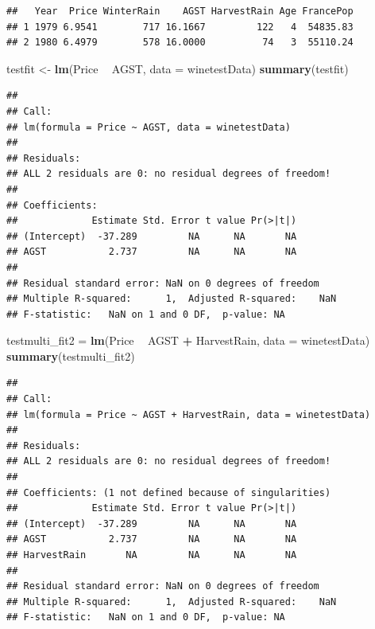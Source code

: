 \documentclass[
]{article}
\newenvironment{Shaded}{\begin{snugshade}}{\end{snugshade}}
\newcommand{\DataTypeTok}[1]{\textcolor[rgb]{0.13,0.29,0.53}{#1}}
\newcommand{\KeywordTok}[1]{\textcolor[rgb]{0.13,0.29,0.53}{\textbf{#1}}}
\newcommand{\NormalTok}[1]{#1}
\newcommand{\OperatorTok}[1]{\textcolor[rgb]{0.81,0.36,0.00}{\textbf{#1}}}
\newcommand{\StringTok}[1]{\textcolor[rgb]{0.31,0.60,0.02}{#1}}
\begin{document}
\begin{verbatim}
##   Year  Price WinterRain    AGST HarvestRain Age FrancePop
## 1 1979 6.9541        717 16.1667         122   4  54835.83
## 2 1980 6.4979        578 16.0000          74   3  55110.24
\end{verbatim}

\begin{Shaded}
\begin{Highlighting}[]
\NormalTok{testfit <-}\StringTok{ }\KeywordTok{lm}\NormalTok{(Price }\OperatorTok{~}\StringTok{ }\NormalTok{AGST, }\DataTypeTok{data =}\NormalTok{ winetestData)}
\KeywordTok{summary}\NormalTok{(testfit)}
\end{Highlighting}
\end{Shaded}

\begin{verbatim}
## 
## Call:
## lm(formula = Price ~ AGST, data = winetestData)
## 
## Residuals:
## ALL 2 residuals are 0: no residual degrees of freedom!
## 
## Coefficients:
##             Estimate Std. Error t value Pr(>|t|)
## (Intercept)  -37.289         NA      NA       NA
## AGST           2.737         NA      NA       NA
## 
## Residual standard error: NaN on 0 degrees of freedom
## Multiple R-squared:      1,  Adjusted R-squared:    NaN 
## F-statistic:   NaN on 1 and 0 DF,  p-value: NA
\end{verbatim}

\begin{Shaded}
\begin{Highlighting}[]
\NormalTok{testmulti_fit2 =}\StringTok{ }\KeywordTok{lm}\NormalTok{(Price }\OperatorTok{~}\StringTok{ }\NormalTok{AGST }\OperatorTok{+}\StringTok{ }\NormalTok{HarvestRain, }\DataTypeTok{data =}\NormalTok{ winetestData)}
\KeywordTok{summary}\NormalTok{(testmulti_fit2)}
\end{Highlighting}
\end{Shaded}

\begin{verbatim}
## 
## Call:
## lm(formula = Price ~ AGST + HarvestRain, data = winetestData)
## 
## Residuals:
## ALL 2 residuals are 0: no residual degrees of freedom!
## 
## Coefficients: (1 not defined because of singularities)
##             Estimate Std. Error t value Pr(>|t|)
## (Intercept)  -37.289         NA      NA       NA
## AGST           2.737         NA      NA       NA
## HarvestRain       NA         NA      NA       NA
## 
## Residual standard error: NaN on 0 degrees of freedom
## Multiple R-squared:      1,  Adjusted R-squared:    NaN 
## F-statistic:   NaN on 1 and 0 DF,  p-value: NA
\end{verbatim}
\end{document}
